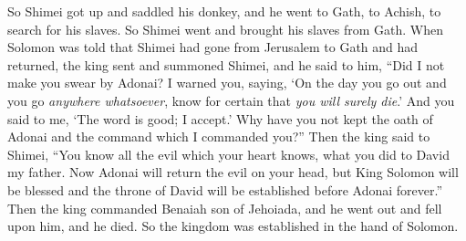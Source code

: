 \begin{biblechapter}
\verse So Shimei got up and saddled his donkey, and he went to Gath, to Achish, to search for his slaves. So Shimei went and brought his slaves from Gath.
\verse When Solomon was told that Shimei had gone from Jerusalem to Gath and had returned,
\verse the king sent and summoned Shimei, and he said to him, “Did I not make you swear by Adonai? I warned you, saying, ‘On the day you go out and you go \textit{anywhere whatsoever}, know for certain that \textit{you will surely die}.’ And you said to me, ‘The word is good; I accept.’
\verse Why have you not kept the oath of Adonai and the command which I commanded you?”
\verse Then the king said to Shimei, “You know all the evil which your heart knows, what you did to David my father. Now Adonai will return the evil on your head,
\verse but King Solomon will be blessed and the throne of David will be established before Adonai forever.”
\verse Then the king commanded Benaiah son of Jehoiada, and he went out and fell upon him, and he died. So the kingdom was established in the hand of Solomon.
\end{biblechapter}

